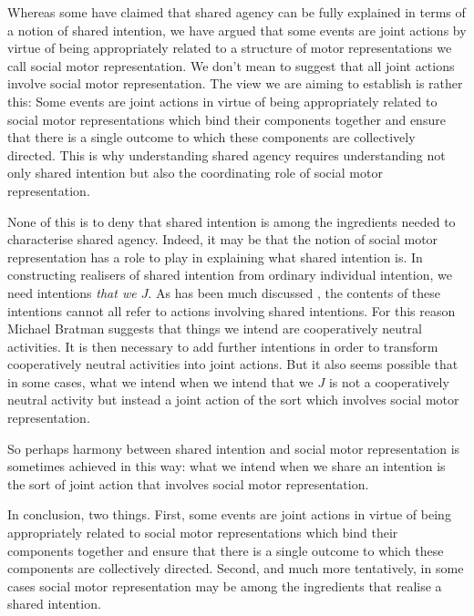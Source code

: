 \documentclass[12pt,\papersize]{extarticle}
\begin{document}
Whereas some have claimed that shared agency can be fully explained in terms of a notion of shared intention, we have argued that some events are joint actions by virtue of being appropriately related to a structure of motor representations we call social motor representation.
We don’t mean to suggest that all joint actions involve social motor representation.
The view we are aiming to establish is rather this: Some events are joint actions in virtue of being appropriately related to social motor representations which bind their components together and ensure that there is a single outcome to which these components are collectively directed.
This is why 
understanding shared agency requires understanding not only shared intention but also
 the coordinating role of social motor representation.

None of this is to deny that shared intention is among the ingredients needed to characterise shared agency.
Indeed, it may be that the notion of social motor representation has a role to play in explaining what shared intention is.
In constructing realisers of shared intention from ordinary individual intention, we need intentions \emph{that we $J$}.
As has been much discussed \citep[e.g.][]{petersson_collectivity_2007}, the contents of these intentions cannot all refer to actions involving shared intentions.
For this reason Michael Bratman suggests that things we intend are  cooperatively neutral activities. %
It is then necessary to add further intentions in order to transform cooperatively neutral activities into joint actions.
But it also seems possible that in some cases, what we intend when we intend that we $J$ is not a cooperatively neutral activity but instead a joint action of the sort which involves social motor representation.

So perhaps harmony between shared intention and social motor representation is sometimes achieved in this way: what we intend when we share an intention is the sort of joint action that involves social motor representation.

In conclusion, two things.
First, some events are joint actions in virtue of being appropriately related to social motor representations which bind their components together and ensure that there is a single outcome to which these components are collectively directed.
Second, and much more tentatively, in some cases social motor representation may be among the ingredients that realise a shared intention.



\end{document}

